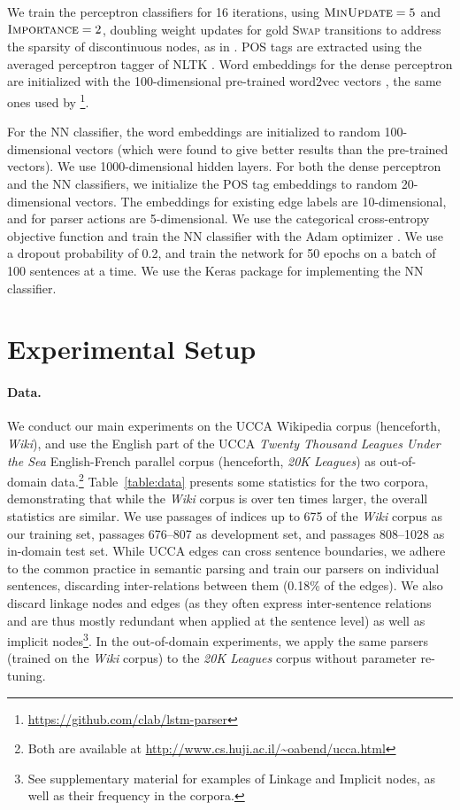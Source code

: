 \documentclass[11pt]{article}
\newcommand{\tabref}[1]{Table~\ref{#1}}
\begin{document}
We train the perceptron classifiers for 16 iterations, using $\textsc{MinUpdate}=5$
and $\textsc{Importance}=2$, doubling weight updates
for gold \textsc{Swap} transitions to address the sparsity of discontinuous nodes,
as in .
POS tags are extracted using the averaged perceptron tagger of NLTK \cite{bird2009natural}.
Word embeddings for the dense perceptron are initialized with the 100-dimensional pre-trained word2vec vectors \cite{mikolov2013efficient},
the same ones used by \footnote{
\url{https://github.com/clab/lstm-parser}}.

For the NN classifier, the word embeddings are initialized to random
100-dimensional vectors (which were found to give better results than the pre-trained vectors). We use 1000-dimensional hidden layers.
For both the dense perceptron and the NN classifiers, we initialize the POS tag embeddings to random 20-dimensional vectors. The embeddings for existing edge labels are 10-dimensional, and for parser actions are 5-dimensional.
We use the categorical cross-entropy objective function and train the
NN classifier with the Adam optimizer \cite{kingma2014adam}. We use a dropout probability of 0.2,
and train the network for 50 epochs on a batch of 100 sentences at a time.
We use the Keras package \cite{chollet2015keras} for implementing the NN classifier.

\section{Experimental Setup}\label{sec:exp_setup}

\paragraph{Data.}
We conduct our main experiments on the UCCA Wikipedia corpus (henceforth, \textit{Wiki}),
and use the English part of the UCCA \textit{Twenty Thousand Leagues Under the Sea} English-French parallel corpus (henceforth, \textit{20K Leagues}) as
out-of-domain data.\footnote{Both are available at \url{http://www.cs.huji.ac.il/~oabend/ucca.html}}
\tabref{table:data} presents some statistics for the two corpora, demonstrating that while
the \textit{Wiki} corpus is over ten times larger, the overall statistics are
similar.
We use passages of indices up to 675
of the \textit{Wiki} corpus as our training set, passages 676--807 as development set,
and passages 808--1028 as in-domain test set.
While UCCA edges can cross sentence boundaries, we adhere to the common
practice in semantic parsing and train our parsers on individual sentences,
discarding inter-relations between them (0.18\% of the edges).
We also discard linkage nodes and edges (as they often express inter-sentence
relations and are thus mostly redundant when applied at the sentence level)
as well as implicit nodes\footnote{See supplementary material for examples
of Linkage and Implicit nodes, as well as their frequency in the corpora.}.
In the out-of-domain experiments, we apply the same parsers
(trained on the \textit{Wiki} corpus) to the \textit{20K Leagues} corpus
without parameter re-tuning.
\end{document}
